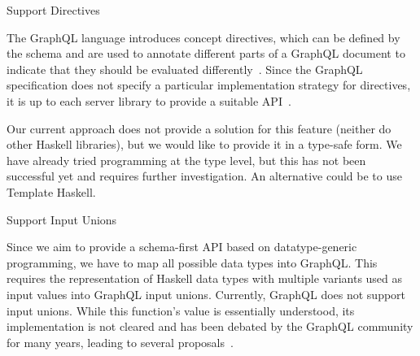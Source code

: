 \begin{frame}
\begin{block}{Support Directives} 

The GraphQL language introduces concept directives, which can be defined by the schema and are used to annotate different parts of a GraphQL document to indicate that they should be evaluated differently~\cite{gql-spec}. Since the GraphQL specification does not specify a particular implementation strategy for directives, it is up to each server library to provide a suitable API~\cite{schema-directives}.

Our current approach does not provide a solution for this feature (neither do other Haskell libraries), but we would like to provide it in a type-safe form. We have already tried programming at the type level, but this has not been successful yet and requires further investigation. An alternative could be to use Template Haskell. 

\end{block}

\begin{block}{Support Input Unions} 

Since we aim to provide a schema-first API based on datatype-generic programming, we have to map all possible data types into GraphQL. This requires the representation of Haskell data types with multiple variants used as input values into GraphQL input unions. Currently, GraphQL does not support input unions. While this function's value is essentially understood, its implementation is not cleared and has been debated by the GraphQL community for many years, leading to several proposals~\cite{gql-spec-input-unions}. 

\end{block}

\end{frame}
